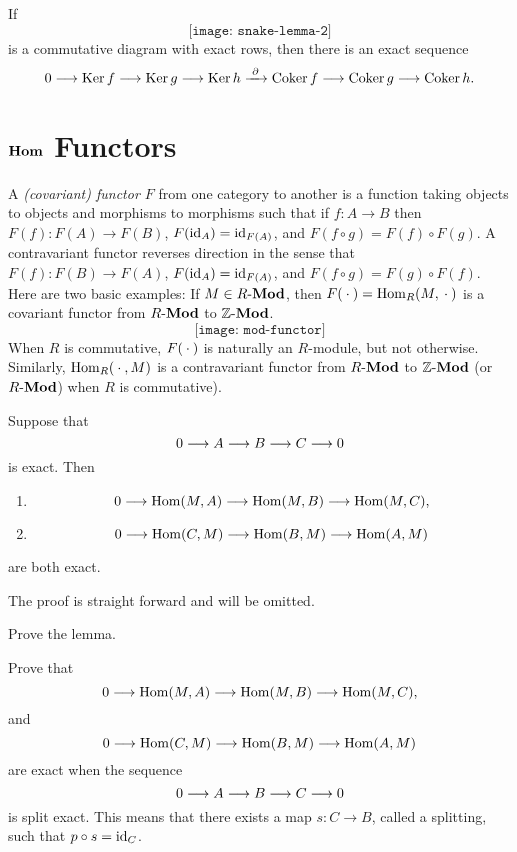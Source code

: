 \begin{theorem}
  If
  \[
    \texttt{[image: snake-lemma-2]}
  \]
  is a commutative diagram with exact rows, then there is an exact sequence
  \[
    0\longrightarrow\operatorname{Ker} f
    \longrightarrow\operatorname{Ker} g
    \longrightarrow\operatorname{Ker} h
    \xrightarrow{\,\,\partial\,\,}\operatorname{Coker} f
    \longrightarrow\operatorname{Coker} g
    \longrightarrow\operatorname{Coker} h.
  \]
\end{theorem}
\section[\(\Hom\) Functors]{\(\boldsymbol{\operatorname{Hom}}\) Functors}
A \emph{(covariant) functor \(F\)} from one category to another is a
function taking objects to objects and morphisms to morphisms such that if
\(f\colon A\to B\) then \(F(f)\colon F(A)\to F(B)\),
\(F(\operatorname{id}_A)=\operatorname{id}_{F(A)}\), and \(F(f\circ g)=F(f)\circ F(g)\). A
contravariant functor reverses direction in the sense that
\(F(f)\colon F(B)\to F(A)\), \(F(\operatorname{id}_A)=\operatorname{id}_{F(A)}\), and
\(F(f\circ g)=F(g)\circ F(f)\). Here are two basic examples: If
\(M\in R\textnormal{-}\mathbf{Mod}\), then \(F({}\cdot{})=\operatorname{Hom}_R(M,{}\cdot{})\) is a covariant functor
from \(R\textnormal{-}\mathbf{Mod}\) to \(\mathbb{Z}\textnormal{-}\mathbf{Mod}\).
\[
  \texttt{[image: mod-functor]}
\]
When \(R\) is commutative, \(F({}\cdot{})\) is naturally an \(R\)-module, but
not otherwise. Similarly, \(\operatorname{Hom}_R({}\cdot{},M)\) is a contravariant functor
from \(R\textnormal{-}\mathbf{Mod}\) to \(\mathbb{Z}\textnormal{-}\mathbf{Mod}\) (or \(R\textnormal{-}\mathbf{Mod}\)) when \(R\) is
commutative).

\begin{lemma}
  Suppose that
  \[
    0\longrightarrow A\longrightarrow B\longrightarrow C\longrightarrow 0
  \]
  is exact. Then
  \begin{enumerate}[label=\emph{(\alph*)},noitemsep]
  \item \[0\longrightarrow\operatorname{Hom}(M,A)\longrightarrow\operatorname{Hom}(M,B)\longrightarrow\operatorname{Hom}(M,C),\]
  \item \[0\longrightarrow\operatorname{Hom}(C,M)\longrightarrow\operatorname{Hom}(B,M)\longrightarrow\operatorname{Hom}(A,M)\]
  \end{enumerate}
  are both exact.
\end{lemma}
The proof is straight forward and will be omitted.

\begin{exercise}
  Prove the lemma.
\end{exercise}

\begin{exercise}
  Prove that
  \[0\longrightarrow\operatorname{Hom}(M,A)\longrightarrow\operatorname{Hom}(M,B)\longrightarrow\operatorname{Hom}(M,C),\]
  and
  \[0\longrightarrow\operatorname{Hom}(C,M)\longrightarrow\operatorname{Hom}(B,M)\longrightarrow\operatorname{Hom}(A,M)\]
  are exact when the sequence
  \[0\longrightarrow A\longrightarrow B\longrightarrow C\longrightarrow 0\]
  is split exact. This means that there exists a map \(s\colon C\to B\),
  called a splitting, such that \(p\circ s=\operatorname{id}_C\).
\end{exercise}

